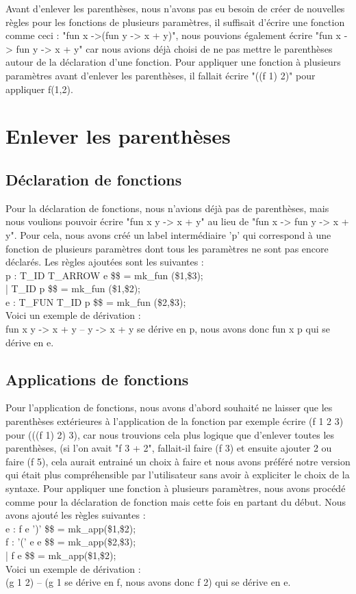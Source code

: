 \documentclass{report}
\begin{document}
Avant d'enlever les parenthèses, nous n'avons pas eu besoin de créer de nouvelles règles pour les fonctions de plusieurs paramètres, il suffisait d'écrire une fonction comme ceci : "fun x ->(fun y -> x + y)", nous pouvions également écrire "fun x -> fun y -> x + y" car nous avions déjà choisi de ne pas mettre le parenthèses autour de la déclaration d'une fonction.
Pour appliquer une fonction à plusieurs paramètres avant d'enlever les parenthèses, il fallait écrire "((f 1) 2)" pour appliquer f(1,2).

\section{Enlever les parenthèses}
\subsection{Déclaration de fonctions}

Pour la déclaration de fonctions, nous n'avions déjà pas de parenthèses, mais nous voulions pouvoir écrire "fun x y -> x + y" au lieu de "fun x -> fun y -> x + y". Pour cela, nous avons créé un label intermédiaire 'p' qui correspond à une fonction de plusieurs paramètres dont tous les paramètres ne sont pas encore déclarés. Les règles ajoutées sont les suivantes :\\
p : T\_ID T\_ARROW e {\$\$ = mk\_fun (\$1,\$3);}\\
| T\_ID p           {\$\$ = mk\_fun (\$1,\$2);}\\
e : T\_FUN T\_ID p {\$\$ = mk\_fun (\$2,\$3);}\\
Voici un exemple de dérivation :\\
fun x y -> x + y -- y -> x + y se dérive en p, nous avons donc fun x p qui se dérive en e.

\subsection{Applications de fonctions}

Pour l'application de fonctions, nous avons d'abord souhaité ne laisser que les parenthèses extérieures à l'application de la fonction par exemple écrire (f 1 2 3) pour (((f 1) 2) 3), car nous trouvions cela plus logique que d'enlever toutes les parenthèses, (si l'on avait "f 3 + 2", fallait-il faire (f 3) et ensuite ajouter 2 ou faire (f 5), cela aurait entrainé un choix à faire et nous avons préféré notre version qui était plus compréhensible par l'utilisateur sans avoir à expliciter le choix de la syntaxe.
Pour appliquer une fonction à plusieurs paramètres, nous avons procédé comme pour la déclaration de fonction mais cette fois en partant du début. Nous avons ajouté les règles suivantes :\\
e : f e ')'      {\$\$ = mk\_app(\$1,\$2);}\\
f : '(' e e {\$\$ = mk\_app(\$2,\$3);}\\
| f e       {\$\$ = mk\_app(\$1,\$2);}\\
Voici un exemple de dérivation :\\
(g 1 2) -- (g 1 se dérive en f, nous avons donc f 2) qui se dérive en e.
\end{document}

